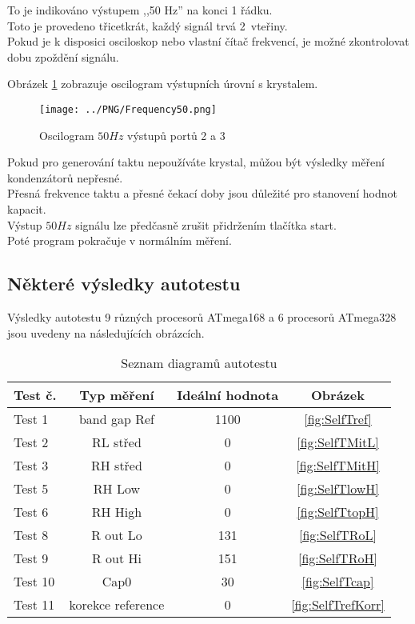 To je indikováno výstupem ,,50 Hz'' na konci 1 řádku.
\\Toto je provedeno třicetkrát, každý signál trvá 2~vteřiny.
\\Pokud je k disposici osciloskop nebo vlastní čítač frekvencí, je možné zkontrolovat dobu zpoždění signálu.

Obrázek \ref{fig:Frequency50} zobrazuje oscilogram výstupních úrovní s krystalem.

\begin{figure}[H]
\centering
\texttt{[image: ../PNG/Frequency50.png]}
\caption{Oscilogram \(50Hz\) výstupů portů 2 a 3}
\label{fig:Frequency50}
\end{figure}

Pokud pro generování taktu nepoužíváte krystal, můžou být výsledky měření kondenzátorů nepřesné.
\\Přesná frekvence taktu a přesné čekací doby jsou důležité pro stanovení hodnot kapacit.
\\Výstup  \(50Hz\) signálu lze předčasně zrušit přidržením tlačítka start.
\\Poté program pokračuje v normálním měření.

\subsection{Některé výsledky autotestu}

Výsledky autotestu 9 různých procesorů ATmega168 a 6 procesorů ATmega328
jsou uvedeny na následujících obrázcích. 

\begin{table}[H]
  \begin{center}
    \begin{tabular}{| l | c | c | c |}
    \hline
Test č. &  Typ měření    & Ideální hodnota & Obrázek \\
    \hline
    \hline
Test 1 & band gap Ref  & 1100 & \ref{fig:SelfTref} \\
    \hline
Test 2 & RL střed & 0 & \ref{fig:SelfTMitL} \\
    \hline
Test 3 & RH střed & 0 & \ref{fig:SelfTMitH} \\
    \hline
Test 5 & RH Low &  0 & \ref{fig:SelfTlowH} \\
    \hline
Test 6 & RH High & 0 & \ref{fig:SelfTtopH} \\
    \hline
Test 8 & R out Lo & 131 & \ref{fig:SelfTRoL} \\
    \hline
Test 9 & R out Hi & 151 & \ref{fig:SelfTRoH} \\
    \hline
Test 10 & Cap0  & 30 & \ref{fig:SelfTcap} \\
    \hline
Test 11 & korekce reference  & 0 & \ref{fig:SelfTrefKorr} \\
    \hline
    \end{tabular}
  \end{center}
  \caption{Seznam diagramů autotestu}
  \label{tab:test_m168} 
\end{table}

